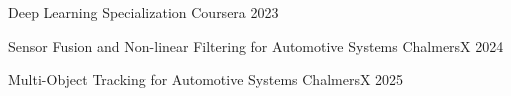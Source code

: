

\begin{cvhonors}

  \cvhonor
    {Deep Learning Specialization} %
    {Coursera} %
    {} %
    {2023} %

  \cvhonor
    {Sensor Fusion and Non-linear Filtering for Automotive Systems} %
    {ChalmersX} %
    {} %
    {2024} %

  \cvhonor
    {Multi-Object Tracking for Automotive Systems} %
    {ChalmersX} %
    {} %
    {2025} %

\end{cvhonors}

